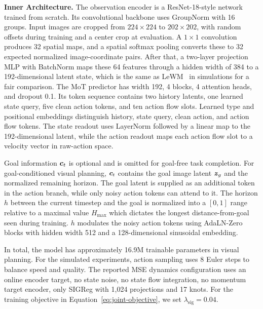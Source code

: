 \documentclass{article} %
\newcommand{\lead}[1]{\textbf{#1}}
\begin{document}
\lead{Inner Architecture.} The observation encoder is
a ResNet-18-style network~\citep{he2016resnet} trained from scratch. Its convolutional backbone
uses GroupNorm with 16 groups. Input images are cropped from $224\times224$ to $202\times202$,
with random offsets during training and a center crop at evaluation. A $1\times1$ convolution
produces 32 spatial maps, and a spatial softmax pooling converts these to 32 expected normalized image-coordinate
pairs. After that, a two-layer projection MLP with BatchNorm maps these 64 features through a hidden width
of 384 to a 192-dimensional latent state, which is the same as LeWM~\citep{maes2026lewm} in simulations for a fair comparison. The MoT predictor has width 192, 4 blocks, 4 attention heads, and dropout 0.1. Its token sequence contains two history
latents, one learned state query, five clean action tokens, and ten action flow slots. Learned
type and positional embeddings distinguish history, state query, clean action, and action flow
tokens. The state readout uses LayerNorm followed by a linear map to the 192-dimensional latent,
while the action readout maps each action flow slot to a velocity vector in raw-action space.

Goal information ${\bm{c}}_t$ is optional and is omitted for goal-free task completion. For goal-conditioned visual planning, ${\bm{c}}_t$ contains the goal image latent ${\bm{z}}_g$ and the normalized remaining horizon. The goal latent is supplied as an additional token in the action branch, while only noisy action tokens can attend to it. The horizon $h$ between the current timestep and the goal is normalized into a $[0,1]$ range relative to a maximal value $H_{\mathrm{max}}$ which dictates the longest distance-from-goal seen during training. $h$ modulates the noisy action tokens using AdaLN-Zero~\citep{peebles2023dit} blocks with hidden width 512 and a 128-dimensional sinusoidal embedding.

In total, the model has approximately 16.9M trainable parameters in visual planning. For the simulated experiments, action sampling uses 8 Euler steps to balance speed and quality.
The reported MSE dynamics configuration uses an online encoder target, no state noise, no state
flow integration, no momentum target encoder, only SIGReg with 1,024 projections and 17 knots. For the training objective in Equation~\ref{eq:joint-objective}, we set $\lambda_{\mathrm{sig}} = 0.04$.
\end{document}
